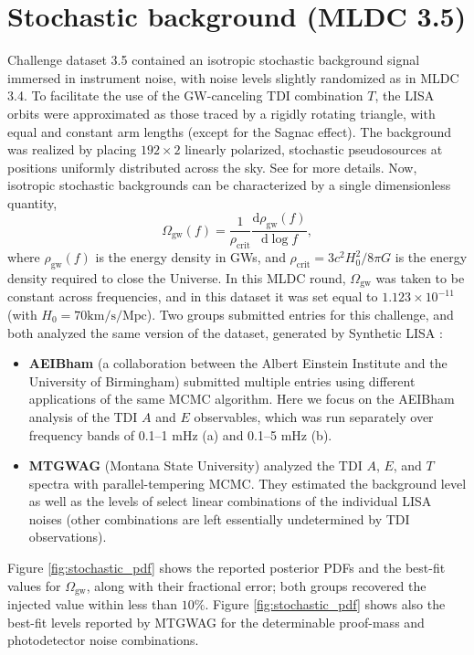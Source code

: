 \documentclass{iopart}
\begin{document}
\section{Stochastic background (MLDC 3.5)}

Challenge dataset 3.5 contained an isotropic stochastic background signal immersed in instrument noise, with noise levels slightly randomized as in MLDC 3.4.
To facilitate the use of the GW-canceling TDI combination $T$, 
the LISA orbits were approximated as those traced by a rigidly rotating
triangle, with equal and constant arm lengths (except for the Sagnac effect). The background was realized by placing $192 \times 2$ linearly polarized, stochastic pseudosources at positions uniformly distributed across the sky. See \cite{MLDC3} for more details. Now, isotropic stochastic backgrounds can be characterized by a single dimensionless quantity,
%
\begin{equation}
\Omega_{\mathrm{gw}}(f)=\frac{1}{\rho_{\mathrm{crit}}}\frac{\mathrm{d} \rho_{\mathrm{gw}}(f)}{\mathrm{d} \log{f}},
\end{equation}
%
where $\rho_{\mathrm{gw}}(f)$ is the energy density in GWs,
and $\rho_{\mathrm{crit}}=3c^2H_0^2/8\pi G$ is the energy density required
to close the Universe. In this MLDC round, $\Omega_{\mathrm{gw}}$ was taken to be constant across frequencies, and in this dataset it was set equal to $1.123 \times 10^{-11}$ (with $H_0=70 \mathrm{km}/\mathrm{s}/\mathrm{Mpc}$). Two groups submitted entries for this challenge, and both analyzed the same version of the dataset, generated by Synthetic LISA \cite{synthlisa}:
%
\begin{itemize}
\item \textbf{AEIBham} (a collaboration between the Albert Einstein Institute
and the University of Birmingham) submitted multiple entries using different applications of the same MCMC algorithm. Here we focus on the AEIBham analysis of the TDI $A$ and $E$ observables, which was run separately over frequency bands of 0.1--1 mHz (a) and 0.1--5 mHz (b).
\item \textbf{MTGWAG} (Montana State University) analyzed the TDI $A$, $E$, and $T$ spectra with parallel-tempering MCMC. They estimated the background level as well as the levels of select linear combinations of the individual LISA noises (other combinations are left essentially undetermined by TDI observations).
\end{itemize}
%
Figure \ref{fig:stochastic_pdf} shows the reported posterior PDFs and the best-fit values for $\Omega_{\mathrm{gw}}$, along with their fractional error; both groups recovered the injected value within less than $10\%$. Figure \ref{fig:stochastic_pdf} shows also the best-fit levels reported by MTGWAG for the determinable proof-mass and photodetector noise combinations.
\end{document}
